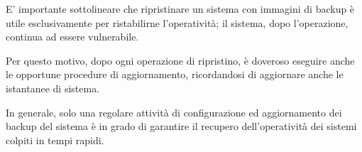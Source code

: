 \documentclass[10pt,a4paper, titlepage]{report}
\begin{document}
E' importante sottolineare che ripristinare un sistema con immagini di backup è utile esclusivamente per ristabilirne l'operatività; il sistema, dopo l'operazione, continua ad essere vulnerabile.

Per questo motivo, dopo ogni operazione di ripristino, è doveroso eseguire anche le opportune procedure di aggiornamento, ricordandosi di aggiornare anche le istantanee di sistema.

In generale, solo una regolare attività di configurazione ed aggiornamento dei backup del sistema è in grado di garantire il recupero dell'operatività dei sistemi colpiti in tempi rapidi.

\listoftables
\lstlistoflistings
\end{document}
